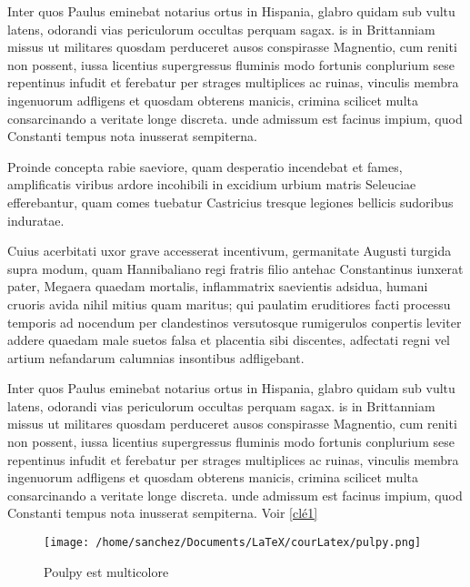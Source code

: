 \documentclass{report}
\begin{document}
Inter quos Paulus eminebat notarius ortus in Hispania, glabro quidam sub vultu latens, odorandi vias periculorum occultas perquam sagax. is in Brittanniam missus ut militares quosdam perduceret ausos conspirasse Magnentio, cum reniti non possent, iussa licentius supergressus fluminis modo fortunis conplurium sese repentinus infudit et ferebatur per strages multiplices ac ruinas, vinculis membra ingenuorum adfligens et quosdam obterens manicis, crimina scilicet multa consarcinando a veritate longe discreta. unde admissum est facinus impium, quod Constanti tempus nota inusserat sempiterna.

Proinde concepta rabie saeviore, quam desperatio incendebat et fames, amplificatis viribus ardore incohibili in excidium urbium matris Seleuciae efferebantur, quam comes tuebatur Castricius tresque legiones bellicis sudoribus induratae.

Cuius acerbitati uxor grave accesserat incentivum, germanitate Augusti turgida supra modum, quam Hannibaliano regi fratris filio antehac Constantinus iunxerat pater, Megaera quaedam mortalis, inflammatrix saevientis adsidua, humani cruoris avida nihil mitius quam maritus; qui paulatim eruditiores facti processu temporis ad nocendum per clandestinos versutosque rumigerulos conpertis leviter addere quaedam male suetos falsa et placentia sibi discentes, adfectati regni vel artium nefandarum calumnias insontibus adfligebant.

\newpage

Inter quos Paulus eminebat notarius ortus in Hispania, glabro quidam sub vultu latens, odorandi vias periculorum occultas perquam sagax. is in Brittanniam missus ut militares quosdam perduceret ausos conspirasse Magnentio, cum reniti non possent, iussa licentius supergressus fluminis modo fortunis conplurium sese repentinus infudit et ferebatur per strages multiplices ac ruinas, vinculis membra ingenuorum adfligens et quosdam obterens manicis, crimina scilicet multa consarcinando a veritate longe discreta. unde admissum est facinus impium, quod Constanti tempus nota inusserat sempiterna.
Voir \ref {clé1}


\begin{figure}[hb]
\begin{center}
\texttt{[image: /home/sanchez/Documents/LaTeX/courLatex/pulpy.png]} 
\end{center}
\caption{Poulpy est multicolore}
\label{Poulpy est multicolore}
\end{figure}
\end{document}
